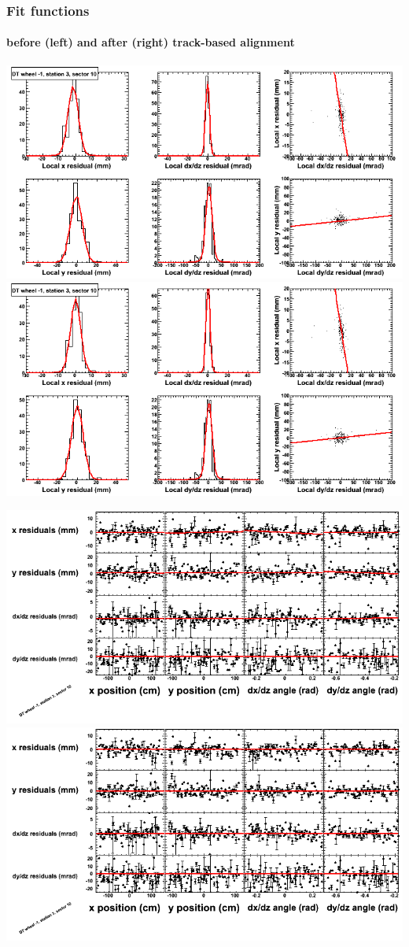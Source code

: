 \documentclass[compress]{beamer}
\begin{document}
\begin{frame}
\frametitle{Fit functions}
\framesubtitle{before (left) and after (right) track-based alignment}
\includegraphics[width=0.5\linewidth]{fitfunctions_re01/MBwhBst3sec10_bellcurves.png} \includegraphics[width=0.5\linewidth]{fitfunctions_re05/MBwhBst3sec10_bellcurves.png}

\includegraphics[width=0.5\linewidth]{fitfunctions_re01/MBwhBst3sec10_polynomials.png} \includegraphics[width=0.5\linewidth]{fitfunctions_re05/MBwhBst3sec10_polynomials.png}
\end{frame}
\end{document}

